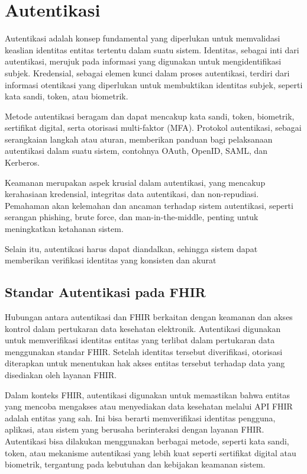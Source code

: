 \section{Autentikasi}
Autentikasi adalah konsep fundamental yang diperlukan untuk memvalidasi keaslian identitas entitas tertentu dalam suatu sistem. Identitas, sebagai inti dari autentikasi, merujuk pada informasi yang digunakan untuk mengidentifikasi subjek. Kredensial, sebagai elemen kunci dalam proses autentikasi, terdiri dari informasi otentikasi yang diperlukan untuk membuktikan identitas subjek, seperti kata sandi, token, atau biometrik.

Metode autentikasi beragam dan dapat mencakup kata sandi, token, biometrik, sertifikat digital, serta otorisasi multi-faktor (MFA). Protokol autentikasi, sebagai serangkaian langkah atau aturan, memberikan panduan bagi pelaksanaan autentikasi dalam suatu sistem, contohnya OAuth, OpenID, SAML, dan Kerberos.

Keamanan merupakan aspek krusial dalam autentikasi, yang mencakup kerahasiaan kredensial, integritas data autentikasi, dan non-repudiasi. Pemahaman akan kelemahan dan ancaman terhadap sistem autentikasi, seperti serangan phishing, brute force, dan man-in-the-middle, penting untuk meningkatkan ketahanan sistem.

Selain itu, autentikasi harus dapat diandalkan, sehingga sistem dapat memberikan verifikasi identitas yang konsisten dan akurat

\subsection{Standar Autentikasi pada FHIR}
Hubungan antara autentikasi dan FHIR berkaitan dengan keamanan dan akses kontrol dalam pertukaran data kesehatan elektronik. Autentikasi digunakan untuk memverifikasi identitas entitas yang terlibat dalam pertukaran data menggunakan standar FHIR. Setelah identitas tersebut diverifikasi, otorisasi diterapkan untuk menentukan hak akses entitas tersebut terhadap data yang disediakan oleh layanan FHIR.

Dalam konteks FHIR, autentikasi digunakan untuk memastikan bahwa entitas yang mencoba mengakses atau menyediakan data kesehatan melalui API FHIR adalah entitas yang sah. Ini bisa berarti memverifikasi identitas pengguna, aplikasi, atau sistem yang berusaha berinteraksi dengan layanan FHIR. Autentikasi bisa dilakukan menggunakan berbagai metode, seperti kata sandi, token, atau mekanisme autentikasi yang lebih kuat seperti sertifikat digital atau biometrik, tergantung pada kebutuhan dan kebijakan keamanan sistem.

